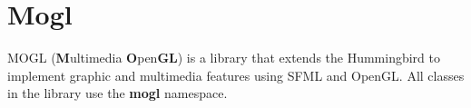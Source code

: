 \section{Mogl}

MOGL (\textbf{M}ultimedia \textbf{O}pen\textbf{GL}) is a library that extends the Hummingbird 
to implement graphic and multimedia features using SFML and OpenGL. All classes in the library 
use the \textbf{mogl} namespace.








